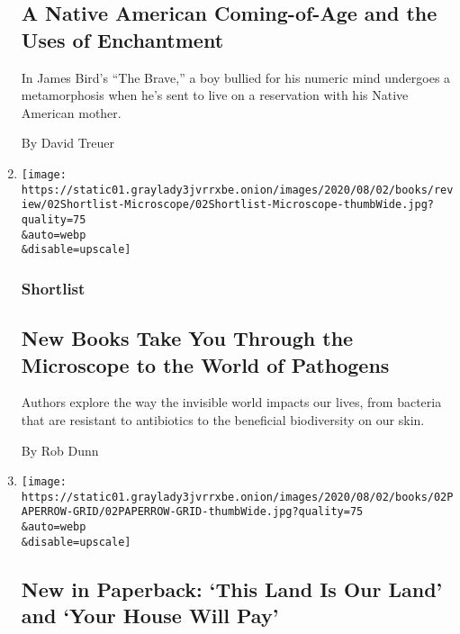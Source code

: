 \begin{enumerate}
  \hypertarget{a-native-american-coming-of-age-and-the-uses-of-enchantment}{%
  \subsection{A Native American Coming-of-Age and the Uses of
  Enchantment}\label{a-native-american-coming-of-age-and-the-uses-of-enchantment}}

  In James Bird's ``The Brave,'' a boy bullied for his numeric mind
  undergoes a metamorphosis when he's sent to live on a reservation with
  his Native American mother.

  By David Treuer
\item
  \href{/2020/07/31/books/review/biography-of-resistance-muhammad-zaman-clean-james-hamblin-the-sensitives-oliver-broudy.html}{}

  \texttt{[image: https://static01.graylady3jvrrxbe.onion/images/2020/08/02/books/review/02Shortlist-Microscope/02Shortlist-Microscope-thumbWide.jpg?quality=75\\\&auto=webp\\\&disable=upscale]}

  \hypertarget{shortlist}{%
  \subsubsection{Shortlist}\label{shortlist}}

  \hypertarget{new-books-take-you-through-the-microscope-to-the-world-of-pathogens}{%
  \subsection{New Books Take You Through the Microscope to the World of
  Pathogens}\label{new-books-take-you-through-the-microscope-to-the-world-of-pathogens}}

  Authors explore the way the invisible world impacts our lives, from
  bacteria that are resistant to antibiotics to the beneficial
  biodiversity on our skin.

  By Rob Dunn
\item
  \href{/2020/07/31/books/review/new-paperbacks.html}{}

  \texttt{[image: https://static01.graylady3jvrrxbe.onion/images/2020/08/02/books/02PAPERROW-GRID/02PAPERROW-GRID-thumbWide.jpg?quality=75\\\&auto=webp\\\&disable=upscale]}

  \hypertarget{new-in-paperback-this-land-is-our-land-and-your-house-will-pay}{%
  \subsection{New in Paperback: `This Land Is Our Land' and `Your House
  Will
  Pay'}\label{new-in-paperback-this-land-is-our-land-and-your-house-will-pay}}


\end{enumerate}
